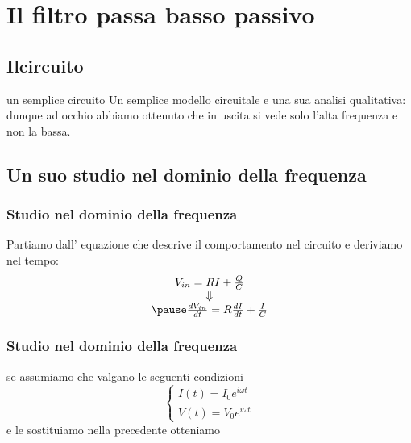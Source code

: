 
	\section{Il filtro passa basso passivo} %
	\label{sec:il_filtro_passa_basso}

		\subsection{Ilcircuito} %
		\label{sub:un_semplice_circuito}
		\begin{frame}[c]{un semplice circuito}
			Un semplice modello circuitale e una sua analisi qualitativa:\\
			\pause
			dunque ad occhio abbiamo ottenuto che in uscita si vede solo l'alta frequenza e non la bassa.
		\end{frame}
	
		\subsection{Un suo studio nel dominio della frequenza} %
		\label{sub:un_suo_studio_nel_dominio_della_frequenza}

		\begin{frame}[c]\frametitle{Studio nel dominio della frequenza}
			Partiamo dall' equazione che descrive il comportamento nel circuito e deriviamo nel tempo:
			\begin{equation}
			    \label{eq:Principale}
				\begin{array}{c}
					V_{in}=R I+\frac{Q}{C} \\	
					\Downarrow\\
					\pause
					\frac{dV_{in}}{dt}=R\frac{dI}{dt}+\frac{I}{C}
				\end{array}
			\end{equation}
		    		
		\end{frame}

		\begin{frame}[c]\frametitle{Studio nel dominio della frequenza}
		    se assumiamo che valgano le seguenti condizioni
		    \begin{equation}
				\begin{cases}
						I\left(t\right)= I_0 e^{i \omega t}\\
						V\left(t\right)= V_0 e^{i \omega t}
				\end{cases}
			\end{equation}
			e le sostituiamo nella precedente otteniamo
		\end{frame}

